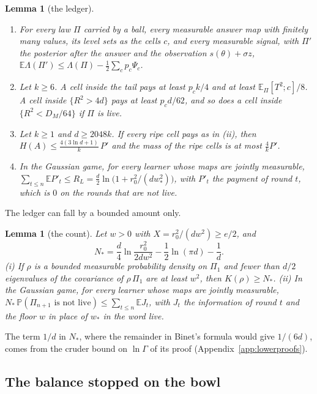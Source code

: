 \documentclass[11pt]{amsart}
\newtheorem{lemma}[theorem]{Lemma}
\theoremstyle{definition}
\numberwithin{equation}{section}
\newcommand{\E}{\mathbb{E}}
\newcommand{\Prob}{\mathbb{P}}
\begin{document}
\begin{lemma}[the ledger]\label{lem:ledger}
\begin{enumerate}[label=(\roman*)]
\item For every law $\Pi$ carried by a ball, every measurable answer map with finitely many values, its level sets as the cells $c$, and every measurable signal, with $\Pi'$ the posterior after the answer and the observation $s(\theta)+\sigma z$, $\E\Lambda(\Pi')\le\Lambda(\Pi)-\frac12\sum_cp_c\Psi_c$.
\item Let $k\ge6$. A cell inside the tail pays at least $p_ck/4$ and at least $\E_\Pi[T^2;c]/8$. A cell inside $\{R^2>4d\}$ pays at least $p_cd/62$, and so does a cell inside $\{R^2<D_M/64\}$ if $\Pi$ is live.
\item Let $k\ge1$ and $d\ge2048k$. If every ripe cell pays as in (ii), then $H(A)\le\frac{4(3\ln d+1)}k\,P'$ and the mass of the ripe cells is at most $\frac4kP'$.
\item In the Gaussian game, for every learner whose maps are jointly measurable, $\sum_{t\le n}\E P'_t\le R_L=\frac d2\ln\bigl(1+r_0^2/(dw_*^2)\bigr)$, with $P'_t$ the payment of round $t$, which is $0$ on the rounds that are not live.
\end{enumerate}
\end{lemma}

The ledger can fall by a bounded amount only.

\begin{lemma}[the count]\label{lem:count}
Let $w>0$ with $X=r_0^2/(dw^2)\ge e/2$, and
\[
N_*=\frac d4\ln\frac{r_0^2}{2dw^2}-\frac12\ln(\pi d)-\frac1d.
\]
(i) If $\rho$ is a bounded measurable probability density on $\Pi_1$ and fewer than $d/2$ eigenvalues of the covariance of $\rho\,\Pi_1$ are at least $w^2$, then $K(\rho)\ge N_*$. (ii) In the Gaussian game, for every learner whose maps are jointly measurable, $N_*\,\Prob(\Pi_{n+1}\text{ is not live})\le\sum_{t\le n}\E J_t$, with $J_t$ the information of round $t$ and the floor $w$ in place of $w_*$ in the word live.
\end{lemma}

The term $1/d$ in $N_*$, where the remainder in Binet's formula would give $1/(6d)$, comes from the cruder bound on $\ln\Gamma$ of its proof (Appendix~\ref{app:lowerproofs}).

\subsection{The balance stopped on the bowl}\label{sec:lower-balance}
\end{document}
